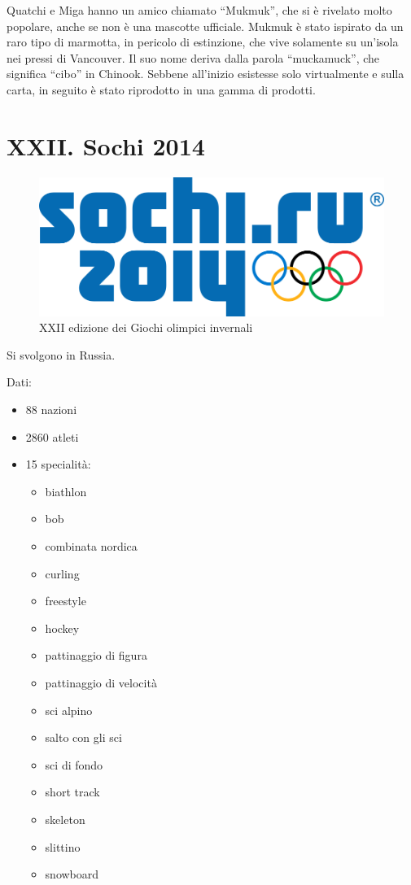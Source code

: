 \documentclass[
]{book}
\providecommand{\tightlist}{%
  \setlength{\itemsep}{0pt}\setlength{\parskip}{0pt}}
\begin{document}
Quatchi e Miga hanno un amico chiamato ``Mukmuk'', che si è rivelato molto popolare, anche se non è una mascotte ufficiale. Mukmuk è stato ispirato da un raro tipo di marmotta, in pericolo di estinzione, che vive solamente su un'isola nei pressi di Vancouver. Il suo nome deriva dalla parola ``muckamuck'', che significa ``cibo'' in Chinook. Sebbene all'inizio esistesse solo virtualmente e sulla carta, in seguito è stato riprodotto in una gamma di prodotti.

\chapter*{XXII. Sochi 2014}\label{xxii.-sochi-2014}

\begin{figure}
\includegraphics[width=0.4\linewidth]{images/loghi/2014} \caption{XXII edizione dei Giochi olimpici invernali}\label{fig:unnamed-chunk-84}
\end{figure}

Si svolgono in Russia.

Dati:

\begin{itemize}
\tightlist
\item
  88 nazioni
\item
  2860 atleti
\item
  15 specialità:

  \begin{itemize}
  \tightlist
  \item
    biathlon
  \item
    bob
  \item
    combinata nordica
  \item
    curling
  \item
    freestyle
  \item
    hockey
  \item
    pattinaggio di figura
  \item
    pattinaggio di velocità
  \item
    sci alpino
  \item
    salto con gli sci
  \item
    sci di fondo
  \item
    short track
  \item
    skeleton
  \item
    slittino
  \item
    snowboard
  \end{itemize}
\end{itemize}
\end{document}
